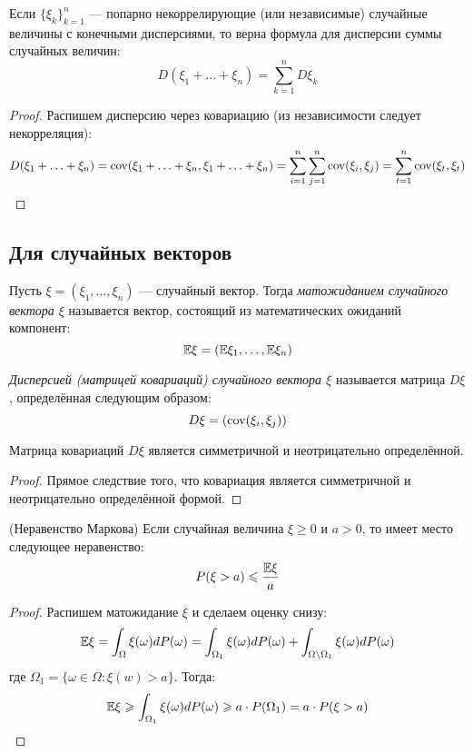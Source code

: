 \begin{corollary}
	Если $\{\xi_k\}_{k = 1}^n$ --- попарно некоррелирующие (или независимые) случайные величины с конечными дисперсиями, то верна формула для дисперсии суммы случайных величин:
	\[
		D(\xi_1 + \ldots + \xi_n) = \sum_{k = 1}^n D\xi_k
	\]
\end{corollary}

\begin{proof}
	Распишем дисперсию через ковариацию (из независимости следует некорреляция):
	\[
		D(\xi_1 + \ldots + \xi_n) = \operatorname{cov}(\xi_1 + \ldots + \xi_n, \xi_1 + \ldots + \xi_n) = \sum_{i = 1}^n \sum_{j = 1}^n \operatorname{cov}(\xi_i, \xi_j) = \sum_{t = 1}^n \operatorname{cov}(\xi_t, \xi_t)
	\]
\end{proof}

\subsection{Для случайных векторов}

\begin{definition}
	Пусть $\xi = (\xi_1, \ldots, \xi_n)$ --- случайный вектор. Тогда \textit{матожиданием случайного вектора $\xi$} называется вектор, состоящий из математических ожиданий компонент:
	\[
		\mathbb{E}\xi = (\mathbb{E}\xi_1, \ldots, \mathbb{E}\xi_n)
	\]
\end{definition}

\begin{definition}
	\textit{Дисперсией (матрицей ковариаций) случайного вектора $\xi$} называется матрица $D\xi$, определённая следующим образом:
	\[
		D\xi = (\operatorname{cov}(\xi_i, \xi_j))
	\]
\end{definition}

\begin{proposition}
	Матрица ковариаций $D\xi$ является симметричной и неотрицательно определённой.
\end{proposition}

\begin{proof}
	Прямое следствие того, что ковариация является симметричной и неотрицательно определённой формой.
\end{proof}

\begin{proposition} (Неравенство Маркова)
	Если случайная величина $\xi \ge 0$ и $a > 0$, то имеет место следующее неравенство:
	\[
		P(\xi > a) \leqslant \frac{\mathbb{E}\xi}{a}
	\]
\end{proposition}

\begin{proof}
	Распишем матожидание $\xi$ и сделаем оценку снизу:
	\[
		\mathbb{E}\xi = \int_{\Omega} \xi(\omega)dP(\omega) = \int_{\Omega_1} \xi(\omega)dP(\omega) + \int_{\Omega \backslash \Omega_1} \xi(\omega)dP(\omega)
	\]
	где $\Omega_1 = \{\omega \in \Omega \colon \xi(w) > a\}$. Тогда:
	\[
		\mathbb{E}\xi \geqslant \int_{\Omega_1} \xi(\omega)dP(\omega) \geqslant a \cdot P(\Omega_1) = a \cdot P(\xi > a)
	\]
\end{proof}

